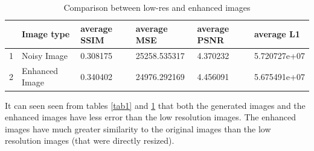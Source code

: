 \documentclass[conference]{IEEEtran}
\begin{document}
		\begin{table}[htbp]
			\caption{Comparison between low-res and enhanced images}
			\begin{center}
				\begin{tabular}{| p{0.2cm}| p{2cm}| p{1.2cm}|p{1.5cm}|p{1.2cm}|p{1.5cm}|}

					\hline

					 & Image type     & average SSIM & average MSE  & average PSNR & average L1 \\ \hline

					1      & Noisy Image    & 0.308175     & 25258.535317 & 4.370232     & 5.720727e+07     \\ \hline

					2      & Enhanced Image & 0.340402     & 24976.292169 & 4.456091     & 5.675491e+07     \\ \hline

				\end{tabular}
				\label{tab2}
			\end{center}
		\end{table}
	
		\par It can seen seen from tables \ref{tab1} and \ref{tab2} that both the generated images and the enhanced images have less error than the low resolution images. The enhanced images have much greater similarity to the original images than the low resolution images (that were directly resized).
	
\end{document}
